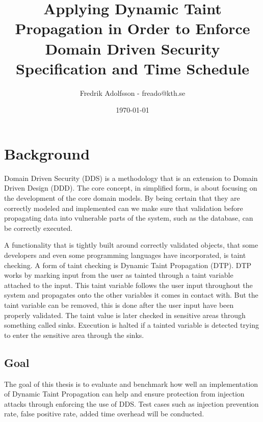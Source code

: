 \documentclass{../kththesis}
\title{Applying Dynamic Taint Propagation in Order to Enforce Domain Driven Security \\
        \large Specification and Time Schedule}
\author{Fredrik Adolfsson - freado@kth.se}
\date{\today}
\begin{document}
\frontmatter


\titlepage


\tableofcontents


\mainmatter



\chapter{Background}
Domain Driven Security (DDS) is a methodology that is an extension to Domain Driven Design (DDD). The core concept, in simplified form, is about focusing on the development of the core domain models. By being certain that they are correctly modeled and implemented can we make sure that validation before propagating data into vulnerable parts of the system, such as the database, can be correctly executed. \parencite{evans_2015, EvansEric2004Dd:t, Wilander2009, Johnsson2009}

A functionality that is tightly built around correctly validated objects, that some developers and even some programming languages have incorporated, is taint checking. \parencite{perl, ruby, Clause2007} A form of taint checking is Dynamic Taint Propagation (DTP). DTP works by marking input from the user as tainted through a taint variable attached to the input. This taint variable follows the user input throughout the system and propagates onto the other variables it comes in contact with. But the taint variable can be removed, this is done after the user input have been properly validated. The taint value is later checked in sensitive areas through something called sinks. Execution is halted if a tainted variable is detected trying to enter the sensitive area through the sinks.  \parencite{Pan2015, Venkataramani2008}


\section{Goal}
The goal of this thesis is to evaluate and benchmark how well an implementation of Dynamic Taint Propagation can help and ensure protection from injection attacks through enforcing the use of DDS. Test cases such as injection prevention rate, false positive rate, added time overhead will be conducted.
\end{document}
